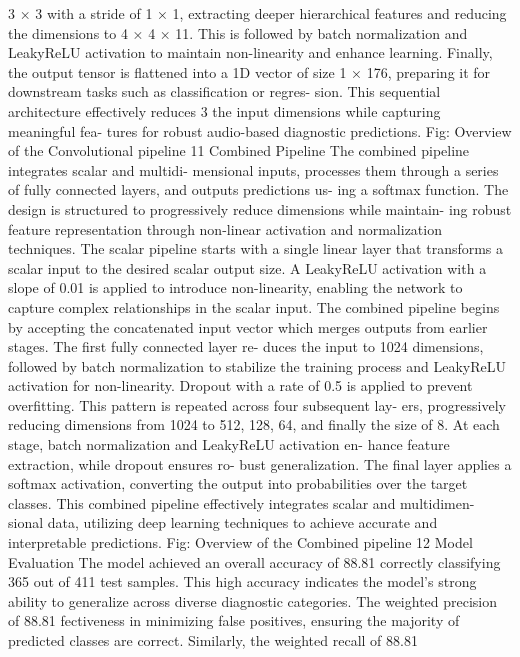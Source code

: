 3 × 3 with a stride of 1 × 1, extracting deeper
hierarchical features and reducing the dimensions to
4 × 4 × 11. This is followed by batch normalization
and LeakyReLU activation to maintain non-linearity
and enhance learning. Finally, the output tensor is
flattened into a 1D vector of size 1 × 176, preparing it
for downstream tasks such as classification or regres-
sion. This sequential architecture effectively reduces
3
the input dimensions while capturing meaningful fea-
tures for robust audio-based diagnostic predictions.
Fig: Overview of the Convolutional pipeline
11 Combined Pipeline
The combined pipeline integrates scalar and multidi-
mensional inputs, processes them through a series of
fully connected layers, and outputs predictions us-
ing a softmax function. The design is structured
to progressively reduce dimensions while maintain-
ing robust feature representation through non-linear
activation and normalization techniques.
The scalar pipeline starts with a single linear layer
that transforms a scalar input to the desired scalar
output size. A LeakyReLU activation with a slope
of 0.01 is applied to introduce non-linearity, enabling
the network to capture complex relationships in the
scalar input.
The combined pipeline begins by accepting the
concatenated input vector which merges outputs
from earlier stages. The first fully connected layer re-
duces the input to 1024 dimensions, followed by batch
normalization to stabilize the training process and
LeakyReLU activation for non-linearity. Dropout
with a rate of 0.5 is applied to prevent overfitting.
This pattern is repeated across four subsequent lay-
ers, progressively reducing dimensions from 1024 to
512, 128, 64, and finally the size of 8. At each stage,
batch normalization and LeakyReLU activation en-
hance feature extraction, while dropout ensures ro-
bust generalization.
The final layer applies a softmax activation,
converting the output into probabilities over
the target classes. This combined pipeline
effectively integrates scalar and multidimen-
sional data, utilizing deep learning techniques
to achieve accurate and interpretable predictions.
Fig: Overview of the Combined pipeline
12 Model Evaluation
The model achieved an overall accuracy of 88.81%
correctly classifying 365 out of 411 test samples. This
high accuracy indicates the model’s strong ability to
generalize across diverse diagnostic categories. The
weighted precision of 88.81%
fectiveness in minimizing false positives, ensuring the
majority of predicted classes are correct. Similarly,
the weighted recall of 88.81%
